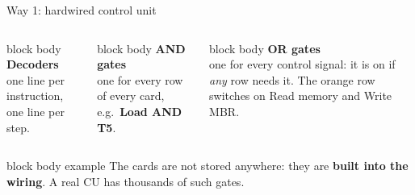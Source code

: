\documentclass[aspectratio=169,10pt]{beamer}
\newcommand{\stepbox}[2]{%
  \begin{beamercolorbox}[rounded=true,sep=0.09cm,wd=\linewidth]{block body}
    \footnotesize\textbf{#1}\\ #2
  \end{beamercolorbox}\vspace{0.06cm}}
\newcommand{\keymsg}[1]{%
  \begin{beamercolorbox}[rounded=true,sep=0.1cm,wd=\textwidth]{block body example}
    \centering\footnotesize #1
  \end{beamercolorbox}}
\begin{document}
\begin{frame}{Way 1: hardwired control unit}
\begin{columns}[c,onlytextwidth]
{}
      \stepbox{Decoders}{one line per instruction, one line per step.}
      \stepbox{AND gates}{one for every row of every card, e.g.\ \textcolor{AccentOrange}{\textbf{Load AND T5}}.}
      \stepbox{OR gates}{one for every control signal: it is on if \emph{any} row needs it.
        The orange row switches on \textcolor{ReadBlue}{Read memory} and \textcolor{WriteRed}{Write MBR}.}
  \end{columns}
  \vspace{0.1cm}
  \keymsg{The cards are not stored anywhere: they are \textbf{built into the wiring}.
    A real CU has thousands of such gates.}
\end{frame}
\end{document}
